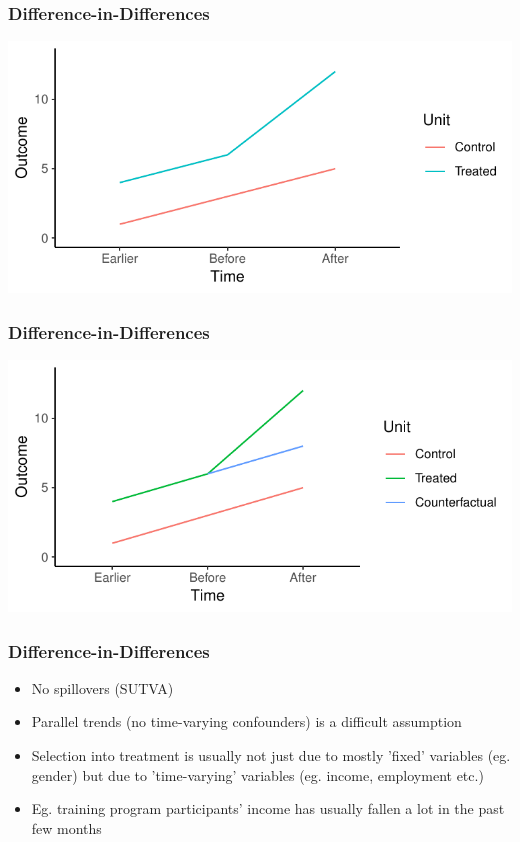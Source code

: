 \documentclass[xcolor=x11names,compress]{beamer}\usepackage[]{graphicx}\usepackage[]{color}
\makeatletter
\def\maxwidth{ %
  \ifdim\Gin@nat@width>\linewidth
    \linewidth
  \else
    \Gin@nat@width
  \fi
}
\newenvironment{knitrout}{}{} %
\renewcommand{\(}{\begin{columns}}
\renewcommand{\)}{\end{columns}}
\newcommand{\<}[1]{\begin{column}{#1}}
\renewcommand{\>}{\end{column}}
\makeatother
\begin{document}
\begin{frame}
\frametitle{Difference-in-Differences}
\begin{knitrout}
\color{fgcolor}
\includegraphics[width=\maxwidth]{figure/DinD_chart6-1} 

\end{knitrout}
\end{frame}

\begin{frame}
\frametitle{Difference-in-Differences}
\begin{knitrout}
\color{fgcolor}
\includegraphics[width=\maxwidth]{figure/DinD_chart7-1} 

\end{knitrout}
\end{frame}

\begin{frame}
\frametitle{Difference-in-Differences}
\begin{itemize}
\item No spillovers (SUTVA)
\pause
\item Parallel trends (no time-varying confounders) is a difficult assumption
\pause
\item Selection into treatment is usually not just due to mostly 'fixed' variables (eg. gender) but due to 'time-varying' variables (eg. income, employment etc.)
\pause
\item Eg. training program participants' income has usually fallen a lot in the past few months
\end{itemize}
\end{frame}
\end{document}
